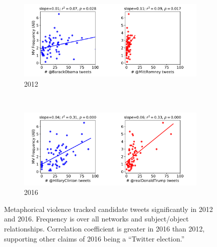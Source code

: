 \clearpage
\begin{figure}[!h]
  \centering
    \begin{subfigure}{0.9\linewidth}
      \centering
      \includegraphics[width=\textwidth]{Figures/2012-all.pdf}
      \caption{2012}
      \label{fig:2012-all-reg}
    \end{subfigure} \\[2em]
    \begin{subfigure}{0.9\linewidth}
      \centering
      \includegraphics[width=\textwidth]{Figures/2016-all.pdf}
      \caption{2016}
      \label{fig:2012-all-reg}
    \end{subfigure}
  \caption{Metaphorical violence tracked candidate tweets significantly in 2012 and
    2016. Frequency is over all networks and subject/object relationships.
    Correlation coefficient is greater in 2016 than 2012, supporting other 
    claims of 2016 being a ``Twitter election.''
  }
  \label{fig:regressions-all}
\end{figure}

\clearpage

